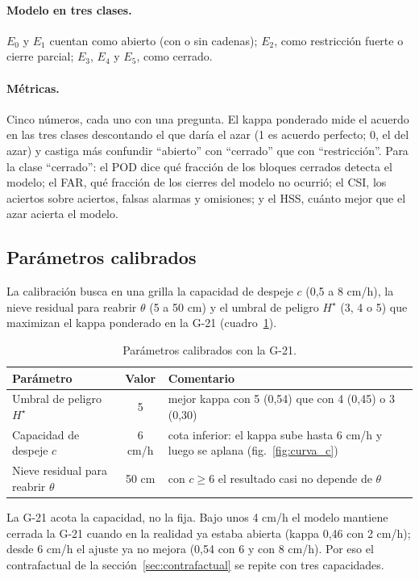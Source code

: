 \paragraph{Modelo en tres clases.} $E_0$ y $E_1$ cuentan como abierto (con o sin cadenas); $E_2$, como restricción fuerte o cierre parcial; $E_3$, $E_4$ y $E_5$, como cerrado.

\paragraph{Métricas.} Cinco números, cada uno con una pregunta. El kappa ponderado mide el acuerdo en las tres clases descontando el que daría el azar (1 es acuerdo perfecto; 0, el del azar) y castiga más confundir ``abierto'' con ``cerrado'' que con ``restricción''. Para la clase ``cerrado'': el POD dice qué fracción de los bloques cerrados detecta el modelo; el FAR, qué fracción de los cierres del modelo no ocurrió; el CSI, los aciertos sobre aciertos, falsas alarmas y omisiones; y el HSS, cuánto mejor que el azar acierta el modelo.

\subsection{Parámetros calibrados}
La calibración busca en una grilla la capacidad de despeje $c$ (0,5 a 8 cm/h), la nieve residual para reabrir $\theta$ (5 a 50 cm) y el umbral de peligro $H^\star$ (3, 4 o 5) que maximizan el kappa ponderado en la G-21 (cuadro~\ref{tab:calibracion}).

\begin{table}[H]
\centering\small
\caption{Parámetros calibrados con la G-21.}
\label{tab:calibracion}
\begin{tabular}{|l|c|l|}
\hline
Parámetro & Valor & Comentario \\ \hline
Umbral de peligro $H^\star$ & 5 & mejor kappa con 5 (0,54) que con 4 (0,45) o 3 (0,30) \\ \hline
Capacidad de despeje $c$ & 6 cm/h & cota inferior: el kappa sube hasta 6 cm/h y luego se aplana (fig.~\ref{fig:curva_c}) \\ \hline
Nieve residual para reabrir $\theta$ & 50 cm & con $c \ge 6$ el resultado casi no depende de $\theta$ \\ \hline
\end{tabular}
\end{table}

La G-21 acota la capacidad, no la fija. Bajo unos 4 cm/h el modelo mantiene cerrada la G-21 cuando en la realidad ya estaba abierta (kappa 0,46 con 2 cm/h); desde 6 cm/h el ajuste ya no mejora (0,54 con 6 y con 8 cm/h). Por eso el contrafactual de la sección~\ref{sec:contrafactual} se repite con tres capacidades.

